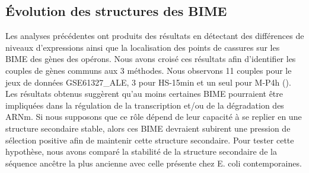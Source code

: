 \documentclass[12pt,a4paper]{report}
\begin{document}
\begin{onehalfspace}
\section*{Évolution des structures des BIME}

Les analyses précédentes ont produits des résultats en détectant des différences de niveaux d'expressions ainsi que la localisation des points de cassures sur les BIME des gènes des opérons. Nous avons croisé ces résultats afin d'identifier les couples de gènes communs aux 3 méthodes. Nous observons 11 couples pour le jeux de données GSE61327\_ALE, 3 pour HS-15min et un seul pour M-P4h ().
Les résultats obtenus suggèrent qu’au moins certaines BIME pourraient être impliquées dans la régulation de la transcription et/ou de la dégradation des ARNm. Si nous supposons que ce rôle dépend de leur capacité à se replier en une structure secondaire stable, alors ces BIME devraient subirent une pression de sélection positive afin de maintenir cette structure secondaire. Pour tester cette hypothèse, nous avons comparé la stabilité de la structure secondaire de la séquence ancêtre la plus ancienne avec celle présente chez E. coli contemporaines.


\end{onehalfspace}
\end{document}
